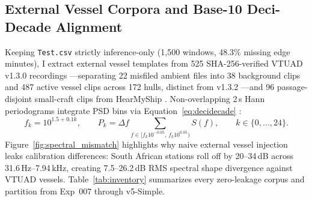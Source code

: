 \documentclass[10pt,a4paper]{article}
\begin{document}
\subsection{External Vessel Corpora and Base-10 Deci-Decade Alignment}

Keeping \texttt{Test.csv} strictly inference-only (1,500 windows, 48.3\% missing edge minutes), I extract external vessel templates from 525 SHA-256-verified VTUAD v1.3.0 recordings \parencite{yuan2026vtuad,onc2026oceans}—separating 22 misfiled ambient files into 38 background clips and 487 active vessel clips across 172 hulls, distinct from v1.3.2 \parencite{yuan2026vtuad132}—and 96 passage-disjoint small-craft clips from HearMyShip \parencite{shipton2025hearmyship,hearmyship2025platform}. Non-overlapping 2\,s Hann periodograms \parencite{welch1967fft} integrate PSD bins via Equation~\eqref{eq:decidecade} \parencite{zindi2026rules,iec2014bands}:
\begin{equation}
\label{eq:decidecade}
f_k = 10^{1.5 + 0.1 k}, \qquad
P_k = \Delta f \sum_{f \in [f_k 10^{-0.05},\, f_k 10^{0.05})} S(f), \qquad
k \in \{0,\dots,24\}.
\end{equation}
Figure~\ref{fig:spectral_mismatch} highlights why naive external vessel injection leaks calibration differences: South African stations roll off by 20--34\,dB across 31.6\,Hz--7.94\,kHz, creating 7.5--26.2\,dB RMS spectral shape divergence against VTUAD vessels. Table~\ref{tab:inventory} summarizes every zero-leakage corpus and partition from Exp~007 through v5-Simple.
\end{document}
